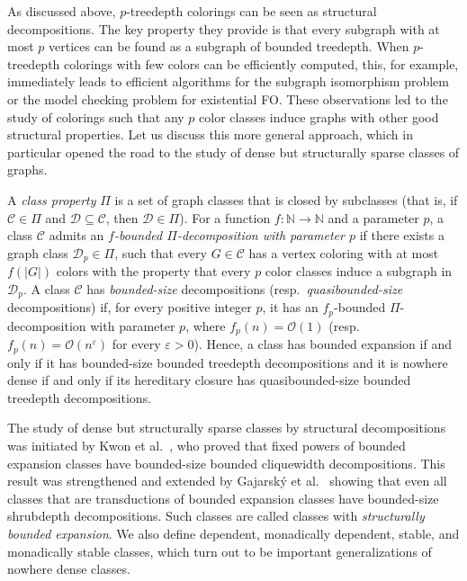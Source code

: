 \documentclass[1p,number,a4paper]{elsarticle}
\theoremstyle{remark}
\renewcommand{\epsilon}{\varepsilon}
\begin{document}
As discussed above, $p$-treedepth colorings can be seen as structural decompositions. 
The key property they provide is that every subgraph with at most $p$ vertices can be found as a subgraph of bounded treedepth. When $p$-treedepth colorings with few colors can be efficiently computed, this, for example, immediately leads to efficient algorithms for the subgraph isomorphism problem or the model checking problem for existential FO. 
These observations led to the study of colorings such that any $p$ color classes induce graphs with other good structural properties. Let us discuss this more general approach, which in particular opened the road to the study of dense but structurally sparse classes of graphs. 

A \emph{class property} $\Pi$ is a set of graph classes that is closed by subclasses (that is, if $\mathscr C\in\Pi$ and $\mathscr D\subseteq\mathscr C$, then $\mathscr D\in\Pi$). 
For a function $f:\mathbb N\rightarrow\mathbb N$ and a parameter $p$, a class $\mathscr C$ admits an 
\emph{$f$-bounded $\Pi$-decomposition with parameter $p$} if  there exists a graph class $\mathscr D_p\in\Pi$, such that  every $G\in\mathscr C$ has a vertex coloring with at most $f(|G|)$ colors with the property  that every $p$ color classes induce a subgraph in $\mathscr D_p$.  A class $\mathscr C$ has \emph{bounded-size} decompositions (resp.\ \emph{quasibounded-size} decompositions) if, for every positive integer $p$, it has an $f_p$-bounded $\Pi$-decomposition with parameter $p$, where  $f_p(n)=\mathcal O(1)$  (resp. $f_p(n)=\mathcal O(n^\epsilon)$ for every $\epsilon>0$). 
Hence, a class has bounded expansion if and only if it has bounded-size bounded treedepth decompositions and it is nowhere dense if and only if its hereditary closure has quasibounded-size bounded treedepth decompositions. 

The study of dense but structurally sparse classes by structural decompositions was initiated by Kwon et al.~\cite{kwon2020low}, who proved that fixed powers of bounded expansion classes have bounded-size bounded cliquewidth decompositions. 
This result was strengthened and extended by Gajarsk{\'y} et al.~\cite{gajarsky2020first} showing that even all classes that are transductions of bounded expansion classes have bounded-size shrubdepth decompositions. Such classes are called classes with \emph{structurally bounded expansion}. 
We also define dependent, monadically dependent, stable, and monadically stable classes, which turn out to be important generalizations of nowhere dense classes. 
\end{document}
